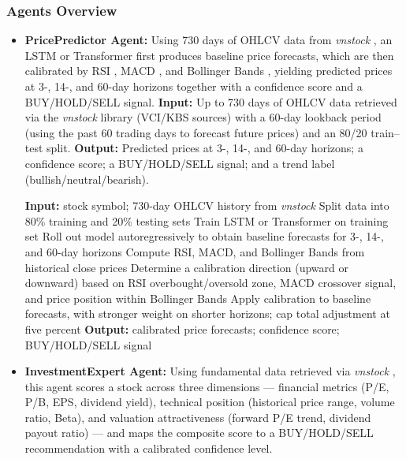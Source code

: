\documentclass{ieeeaccess}
\begin{document}
\subsubsection{Agents Overview}
\begin{itemize}
    \item \textbf{PricePredictor Agent:}
    Using 730 days of OHLCV data from \textit{vnstock} \cite{vnstock2023}, an LSTM \cite{hochreiter1997long}
    or Transformer \cite{vaswani2017attention} first produces baseline price forecasts, which are then
    calibrated by RSI \cite{wilder1978new}, MACD \cite{appel2005technical}, and Bollinger Bands
    \cite{bollinger2002bollinger}, yielding predicted prices
    at 3-, 14-, and 60-day horizons together with a confidence score and a BUY/HOLD/SELL signal.
    \textbf{Input:} Up to 730 days of OHLCV data retrieved via the \textit{vnstock} library \cite{vnstock2023} (VCI/KBS sources) with a 60-day lookback period (using the past 60 trading days to forecast future prices) and an 80/20 train--test split.
    \textbf{Output:} Predicted prices at 3-, 14-, and 60-day horizons; a confidence score; a BUY/HOLD/SELL signal; and a trend label (bullish/neutral/bearish).

    \begin{algorithmic}[1]
    \STATE \textbf{Input:} stock symbol; 730-day OHLCV history from \textit{vnstock}
    \STATE Split data into 80\% training and 20\% testing sets
    \STATE Train LSTM or Transformer on training set
    \STATE Roll out model autoregressively to obtain baseline forecasts for 3-, 14-, and 60-day horizons
    \STATE Compute RSI, MACD, and Bollinger Bands from historical close prices
    \STATE Determine a calibration direction (upward or downward) based on RSI overbought/oversold zone, MACD crossover signal, and price position within Bollinger Bands
    \STATE Apply calibration to baseline forecasts, with stronger weight on shorter horizons; cap total adjustment at five percent
    \STATE \textbf{Output:} calibrated price forecasts; confidence score; BUY/HOLD/SELL signal
    \end{algorithmic}

    \item \textbf{InvestmentExpert Agent:}
    Using fundamental data retrieved via \textit{vnstock} \cite{vnstock2023}, this agent scores
    a stock across three dimensions — financial metrics (P/E, P/B, EPS, dividend yield),
    technical position (historical price range, volume ratio, Beta), and valuation
    attractiveness (forward P/E trend, dividend payout ratio) — and maps the
    composite score to a BUY/HOLD/SELL recommendation with a calibrated confidence level.


\end{itemize}
\end{document}
